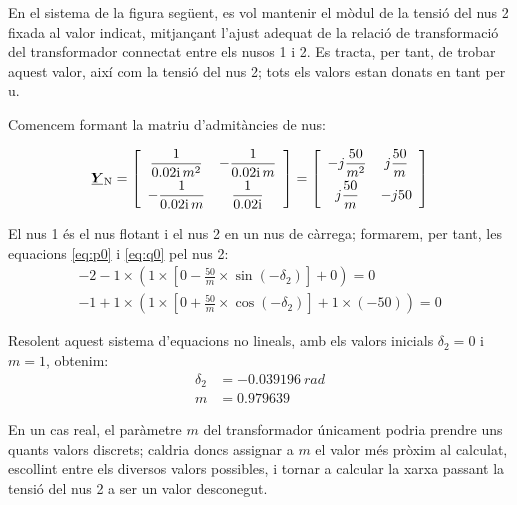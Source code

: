 	
\begin{exemple}\label{ex:ControlTensTrafo}
	\addcontentsxms{\ControlTensTrafo}
    En el sistema de la figura següent, es vol mantenir el mòdul de la
    tensió del nus 2 fixada al valor indicat, mitjançant l'ajust
    adequat de la relació de transformació del transformador connectat
    entre els nusos 1 i 2. Es tracta, per tant, de trobar aquest valor,
    així com la tensió del nus 2; tots els valors estan donats en  tant   per u.

    \begin{center}
        
    \end{center}

    Comencem formant la matriu d'admitàncies de nus:
    
    \[
    \mcmplx{Y}\ped{N} = 
    \begin{bmatrix}\begin{array}{cc} 
    \dfrac{1}{\complexnum{j0,02} \,m^2}  &  -\dfrac{1}{\complexnum{j0,02} \,m} \\[1.5ex]
    -\dfrac{1}{\complexnum{j0,02}\, m}   & \dfrac{1}{\complexnum{j0,02}}
     \end{array}\end{bmatrix} =
    \begin{bmatrix}\begin{array}{cc} 
    -j\dfrac{50}{m^2}  &  j\dfrac{50}{m} \\[1.5ex]
    j\dfrac{50}{m}     & -j 50
     \end{array}\end{bmatrix}
    \]

    El nus 1 és el nus flotant i el nus 2 en un nus de càrrega;
    formarem, per tant,  les equacions \eqref{eq:p0} i \eqref{eq:q0} pel
    nus 2:
    \begin{align*}
    -2 - 1 \times\left( 1 \times\left[ 0 -\frac{50}{m} \times\sin(-\delta_2) \right]  + 0 \right)  = 0   \\[1.5ex]
    -1 + 1 \times\left( 1 \times\left[0 + \frac{50}{m}
    \times\cos(-\delta_2) \right]  + 1\times (-50) \right)  = 0
    \end{align*}

    Resolent aquest sistema d'equacions no lineals, amb els valors
    inicials $\delta_2=0$ i $m=1$, obtenim:
    \begin{align*}
       \delta_2 &= \qty{-0,039196}{rad} \\[1ex]
       m & =\num{0,979639}
    \end{align*}

    En un cas real, el paràmetre $m$ del transformador únicament podria
    prendre uns quants valors discrets; caldria doncs assignar a $m$ el
    valor més pròxim al calculat, escollint entre els diversos valors
    possibles, i tornar a calcular la xarxa passant la tensió del nus
    2 a ser un valor desconegut.
\end{exemple}

